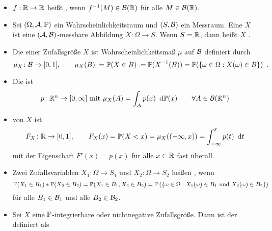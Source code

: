 
\begin{itemize}[leftmargin=*]
	\item $f: \R \to \R $ heißt , wenn $f^{-1}(M) \in \B(\R)$ für alle $M \in \B(\R)$.
	\item Sei $(\Omega,\A, \P)$ ein Wahrscheinlichkeitsraum und $(S,\B)$ ein Messraum. Eine  $X$ ist eine $(\A,\B)$-messbare Abbildung $X \colon \Omega \to S$. Wenn $S =\R $, dann heißt $X$ .
	\item Die  einer Zufallsgröße $X$ ist Wahrscheinlichkeitsmaß $\mu$ auf $\B$ definiert durch
	\begin{equation*}
		\mu_X \colon \B \to [0,1], \qquad 
		\mu_X(B) \defeq \P(X \in B) \defeq \P(X^{-1}(B)) = \P(\menge{ \omega \in \Omega : X(\omega) \in B}) \satzende
	\end{equation*}
	\item Die  ist
	\begin{align*}
		p \colon \R^n \to [0,\infty] \mit \mu_X(A) = \int_A p(x) \diffskip{\P(x)} \qquad \forall A \in \B(\R^n)
	\end{align*}
	\item {} von $X$ ist
	\begin{equation*}
		F_X \colon \R \to [0,1], \qquad F_X(x)=\P(X<x) = \mu_X((-\infty,x)) = \int_{-\infty}^x p(t) \diffskip t
	\end{equation*}
	mit der Eigenschaft $F'(x) = p(x)$ für alle $x \in \R$ fast überall.
	\item Zwei Zufallsvariablen $X_1 \colon \Omega \to S_1$ und $X_2 \colon \Omega \to S_2$ heißen , wenn
	\begin{equation*}
		\P(X_1\in B_1) * \P(X_2\in B_2) = \P(X_1\in B_1, X_2\in B_2) 
		= \P\brackets{\menge{\omega \in \Omega : X_1(\omega)\in B_1 \und X_2(\omega) \in B_2}}
	\end{equation*}
	für alle $B_1 \in \B_1$ und alle $B_2 \in \B_2$.
	\item Sei $X$ eine $\P$-integrierbare oder nichtnegative Zufallsgröße. Dann ist der  definiert als
	\begin{align*}

\end{align*}
\end{itemize}
